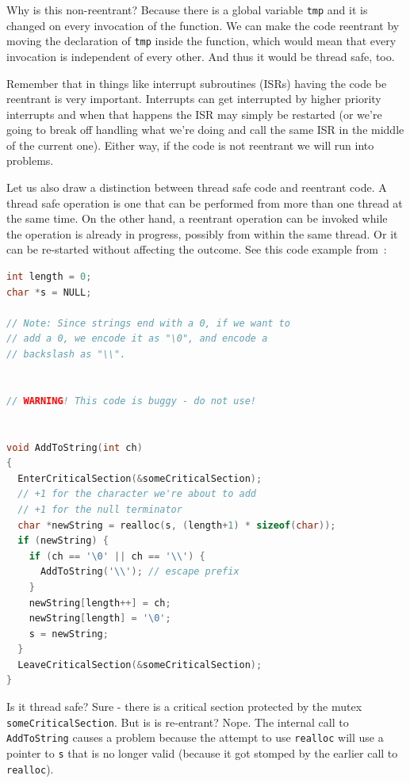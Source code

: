 \documentclass[a4paper]{report}
\begin{document}
Why is this non-reentrant? Because there is a global variable \texttt{tmp} and it is changed on every invocation of the function. We can make the code reentrant by moving the declaration of \texttt{tmp} inside the function, which would mean that every invocation is independent of every other. And thus it would be thread safe, too.

Remember that in things like interrupt subroutines (ISRs) having the code be reentrant is very important. Interrupts can get interrupted by higher priority interrupts and when that happens the ISR may simply be restarted (or we're going to break off handling what we're doing and call the same ISR in the middle of the current one). Either way, if the code is not reentrant we will run into problems.

Let us also draw a distinction between thread safe code and reentrant code. A thread safe operation is one that can be performed from more than one thread at the same time. On the other hand, a reentrant operation can be invoked while the operation is already in progress, possibly from within the same thread. Or it can be re-started without affecting the outcome. See this code example from~\cite{tont:threadsafe}:
\begin{lstlisting}[language=C]
int length = 0;
char *s = NULL;

// Note: Since strings end with a 0, if we want to
// add a 0, we encode it as "\0", and encode a
// backslash as "\\".


// WARNING! This code is buggy - do not use!


void AddToString(int ch)
{
  EnterCriticalSection(&someCriticalSection);
  // +1 for the character we're about to add
  // +1 for the null terminator
  char *newString = realloc(s, (length+1) * sizeof(char));
  if (newString) {
    if (ch == '\0' || ch == '\\') {
      AddToString('\\'); // escape prefix
    }
    newString[length++] = ch;
    newString[length] = '\0';
    s = newString;
  }
  LeaveCriticalSection(&someCriticalSection);
}
\end{lstlisting}

Is it thread safe? Sure - there is a critical section protected by the mutex \texttt{someCriticalSection}. But is is re-entrant? Nope. The internal call to \texttt{AddToString} causes a problem because the attempt to use \texttt{realloc} will use a pointer to \texttt{s} that is no longer valid (because it got stomped by the earlier call to \texttt{realloc}).
\end{document}
